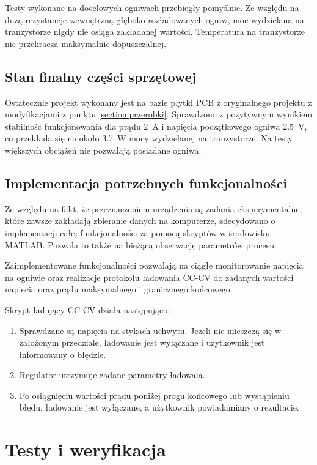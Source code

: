 \documentclass[polish,engineer]{polsl-msth}
\begin{document}
Testy wykonane na docelowych ogniwach przebiegły pomyślnie. Ze względu na dużą rezystancje wewnętrzną głęboko rozładowanych ogniw, moc wydzielana na tranzystorze nigdy nie osiąga zakładanej wartości. Temperatura na tranzystorze nie przekracza maksymalnie dopuszczalnej.

\section{Stan finalny części sprzętowej}
Ostatecznie projekt wykonany jest na bazie płytki PCB z oryginalnego projektu z modyfikacjami z punktu \ref{section:przerobki}. Sprawdzono z pozytywnym wynikiem stabilność funkcjonowania dla prądu 2~A i napięcia początkowego ogniwa 2.5~V, co przekłada się na około 3.7~W mocy wydzielanej na tranzystorze. Na testy większych obciążeń nie pozwalają posiadane ogniwa.

\section{Implementacja potrzebnych funkcjonalności}
Ze względu na fakt, że przeznaczeniem urządzenia są zadania eksperymentalne, które zawsze zakładają zbieranie danych na komputerze, zdecydowano o implementacji całej funkcjonalności za pomocą skryptów w środowisku MATLAB. Pozwala to także na bieżącą obserwację parametrów procesu.

Zaimplementowane funkcjonalności pozwalają na ciągłe monitorowanie napięcia na ogniwie oraz realizacje protokołu ładowania CC-CV do zadanych wartości napięcia oraz prądu maksymalnego i granicznego końcowego.

Skrypt ładujący CC-CV działa następująco:
\begin{enumerate}
    \item Sprawdzane są napięcia na stykach uchwytu. Jeżeli nie mieszczą się w założonym przedziale, ładowanie jest wyłączane i użytkownik jest informowany o błędzie.
    \item Regulator utrzymuje zadane parametry ładowaia.
    \item Po osiągnięciu wartości prądu poniżej progu końcowego lub wystąpieniu błędu, ładowanie jest wyłączane, a użytkownik powiadamiany o rezultacie.
\end{enumerate}


\chapter{Testy i weryfikacja}
\end{document}

